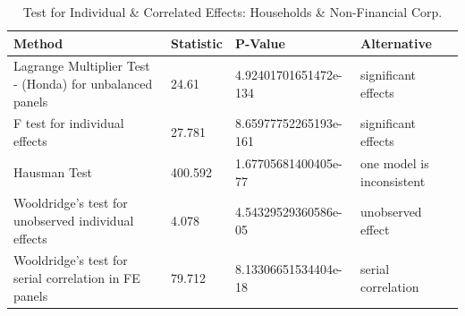 \begin{table}[ht]
\centering
\caption{ Test for Individual & Correlated Effects: Households & Non-Financial Corp.} 
\begingroup\small
\begin{tabular}{llll}
  \toprule
Method & Statistic & P-Value & Alternative \\ 
  \midrule
Lagrange Multiplier Test -  (Honda) for unbalanced panels & 24.61 & 4.92401701651472e-134 & significant effects \\ 
  F test for individual effects & 27.781 & 8.65977752265193e-161 & significant effects \\ 
  Hausman Test & 400.592 & 1.67705681400405e-77 & one model is inconsistent \\ 
  Wooldridge's test for unobserved individual effects & 4.078 & 4.54329529360586e-05 & unobserved effect \\ 
  Wooldridge's test for serial correlation in FE panels & 79.712 & 8.13306651534404e-18 & serial correlation \\ 
   \bottomrule
\end{tabular}
\endgroup
\end{table}
